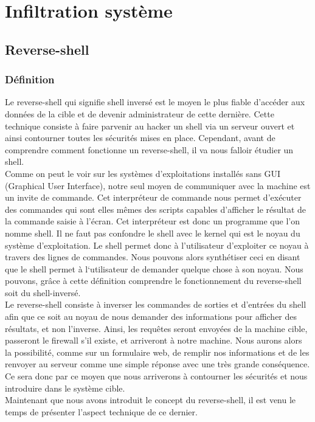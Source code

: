 \chapter{Infiltration système}
\label{chap:BDD}

\section{Reverse-shell}

\subsection{Définition}

Le reverse-shell qui signifie shell inversé est le moyen le plus fiable d’accéder aux données de la cible et de devenir administrateur de cette dernière. Cette technique consiste à faire parvenir au hacker un shell via un serveur ouvert et ainsi contourner toutes les sécurités mises en place. Cependant, avant de comprendre comment fonctionne un reverse-shell, il va nous falloir étudier un shell.\\
Comme on peut le voir sur les systèmes d’exploitations installés sans GUI (Graphical User Interface), notre seul moyen de communiquer avec la machine est un invite de commande. Cet interpréteur de commande nous permet d’exécuter des commandes qui sont elles mêmes des scripts capables d’afficher le résultat de la commande saisie à l’écran. Cet interpréteur est donc un programme que l’on nomme shell. Il ne faut pas confondre le shell avec le kernel qui est le noyau du système d’exploitation. Le shell permet donc à l’utilisateur d’exploiter ce noyau à travers des lignes de commandes.
Nous pouvons alors synthétiser ceci en disant que le shell permet à l‘utilisateur de demander quelque chose à son noyau.
Nous pouvons, grâce à cette définition comprendre le fonctionnement du reverse-shell soit du shell-inversé.\\
Le reverse-shell consiste à inverser les commandes de sorties et d'entrées du shell afin que ce soit au noyau de nous demander des informations pour afficher des résultats, et non l’inverse.
Ainsi, les requêtes seront envoyées de la machine cible, passeront le firewall s’il existe, et arriveront à notre machine. Nous aurons alors la possibilité, comme sur un formulaire web, de remplir nos informations et de les renvoyer au serveur comme une simple réponse avec une très grande conséquence.
Ce sera donc par ce moyen que nous arriverons à contourner les sécurités et nous introduire dans le système cible.\\
Maintenant que nous avons introduit le concept du reverse-shell, il est venu le temps de présenter l’aspect technique de ce dernier.


